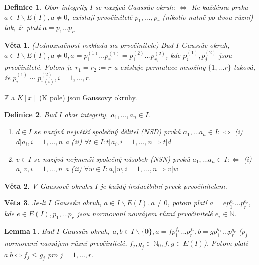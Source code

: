 \documentclass[a4paper, 11pt]{report}
\newtheorem{mydef}{Definice}[chapter]
\newtheorem{veta}{Věta}[chapter]
\newtheorem{lemma}{Lemma}[chapter]
\begin{document}
\begin{mydef}
Obor integrity $I$ se nazývá Gaussův okruh: $\Leftrightarrow$ Ke každému prvku $a \in I \backslash E(I), a \not= 0$, existují prvočinitelé $p_1, \dots, p_r$ (nikoliv nutně po dvou různí) tak, že platí $a = p_1 \dots p_r$
\end{mydef}

\begin{veta}
(Jednoznačnost rozkladu na prvočinitele) Buď $I$ Gaussův okruh, $a \in I \backslash E(I), a \not= 0, a = p_1^{(1)} \dots p_{r_1}^{(1)} = p_1^{(2)} \dots p_{r_2}^{(2)}$, kde $p_i^{(1)}, p_j^{(2)}$ jsou prvočinitelé. Potom je $r_1 = r_2 := r$ a existuje permutace množiny $\{1, \dots r\}$ taková, že $p_i^{(1)} \sim p_{\pi(i)}^{(2)}, i = 1, \dots, r$.
\end{veta}

$\mathbb{Z}$ a $K[x]$ (K pole) jsou Gaussovy okruhy.

\begin{mydef}
Buď $I$ obor integrity, $a_1, \dots, a_n \in I$.
\begin{enumerate}[1)]
	\item $d \in I$ se nazývá \emph{největší společný dělitel} (NSD) prvků $a_1, \dots a_n \in I: \Leftrightarrow$ (i) $d | a_i, i = 1, \dots, n$ a (ii) $\forall t \in I: t|a_i, i = 1, \dots, n \Rightarrow t | d$
	\item $v \in I$ se nazývá \emph{nejmenší společný násobek} (NSN) prvků $a_1, \dots a_n \in I: \Leftrightarrow$ (i) $a_i | v, i = 1, \dots, n$ a (ii) $\forall w \in I: a_i | w, i = 1, \dots, n \Rightarrow v | w$
\end{enumerate}
\end{mydef}

\begin{veta}
V Gaussově okruhu $I$ je každý ireducibilní prvek prvočinitelem.
\end{veta}

\begin{veta}
Je-li $I$ Gaussův okruh, $a \in I \backslash E(I), a \not=0$, potom platí $a = e p_1^{e_1} \dots p_r^{e_r}$, kde $e \in E(I), p_1, \dots p_r$ jsou normovaní navzájem různí prvočinitelé $e_i \in \mathbb{N}$. 
\end{veta}

\begin{lemma}
Buď $I$ Gaussův okruh, $a, b \in I \backslash \{0\}, a = fp_1^{f_1} \dots p_r^{f_r}, b = g p_1^{g_1} \dots p_r^{g_r}$ ($p_j$ normovaní navzájem různí prvočinitelé, $f_j, g_j \in \mathbb{N}_0, f,g \in E(I)$). Potom platí $a|b \Leftrightarrow f_j \leq g_j$ pro $j = 1, \dots, r$.
\end{lemma}
\end{document}
